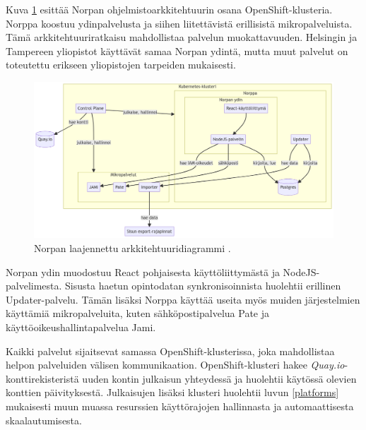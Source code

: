 Kuva \ref{fig:norppa:architecture} esittää Norpan ohjelmistoarkkitehtuurin osana OpenShift-klusteria.
Norppa koostuu ydinpalvelusta ja siihen liitettävistä erillisistä mikropalveluista.
Tämä arkkitehtuuriratkaisu mahdollistaa palvelun muokattavuuden.
Helsingin ja Tampereen yliopistot käyttävät samaa Norpan ydintä, mutta muut palvelut on toteutettu erikseen yliopistojen tarpeiden mukaisesti.

\begin{figure}[ht]
\begin{center}
\includegraphics[width=1\textwidth]{figures/norppa_architecture.png}
\caption{Norpan laajennettu arkkitehtuuridiagrammi \cite{Norppa23}\label{fig:norppa:architecture}.}
\end{center}
\end{figure}

Norpan ydin muodostuu React pohjaisesta käyttöliittymästä ja NodeJS-palvelimesta.
Sisusta haetun opintodatan synkronisoinnista huolehtii erillinen Updater-palvelu.
Tämän lisäksi Norppa käyttää useita myös muiden järjestelmien käyttämiä mikropalveluita, kuten sähköpostipalvelua Pate ja käyttöoikeushallintapalvelua Jami.

Kaikki palvelut sijaitsevat samassa OpenShift-klusterissa, joka mahdollistaa helpon palveluiden välisen kommunikaation.
OpenShift-klusteri hakee \textit{Quay.io}-konttirekisteristä uuden kontin julkaisun yhteydessä ja huolehtii käytössä olevien konttien päivityksestä.
Julkaisujen lisäksi klusteri huolehtii luvun \ref{platforms} mukaisesti muun muassa resurssien käyttörajojen hallinnasta ja automaattisesta skaalautumisesta.
